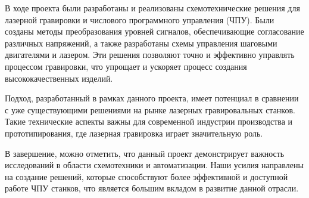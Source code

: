 \label{sec:outro}

В ходе проекта были разработаны и реализованы схемотехнические решения для лазерной гравировки и числового 
программного управления (ЧПУ). Были созданы методы преобразования уровней сигналов, обеспечивающие согласование 
различных напряжений, а также разработаны схемы управления шаговыми двигателями и лазером. 
Эти решения позволяют точно и эффективно управлять процессом гравировки, что упрощает и ускоряет процесс 
создания высококачественных изделий.

Подход, разработанный в рамках данного проекта, имеет потенциал в сравнении с уже существующими решениями на рынке 
лазерных гравировальных станков. Такие технические аспекты важны для современной индустрии производства и 
прототипирования, где лазерная гравировка играет значительную роль.

В завершение, можно отметить, что данный проект демонстрирует важность исследований в области схемотехники и 
автоматизации. Наши усилия направлены на создание решений, которые способствуют более эффективной и доступной 
работе ЧПУ станков, что является большим вкладом в развитие данной отрасли.
